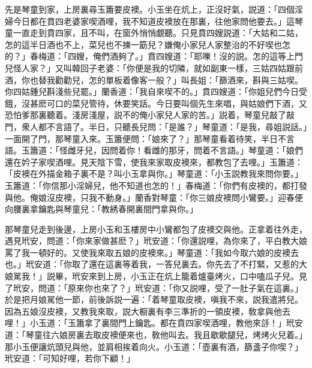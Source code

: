 先是琴童到家，上房裏尋玉簫要皮襖。小玉坐在炕上，正沒好氣，説道：「四個淫婦今日都在賁四老婆家喫酒哩，我不知道皮襖放在那裏，往他家問他要去。」這琴童一直走到賁四家，且不叫，在窗外悄悄覷聽。只見賁四嫂説道：「大姑和二姑，怎的這半日酒也不上，菜兒也不揀一筯兒？嫌俺小家兒人家整治的不好喫也怎的？」春梅道：「四嫂，俺們酒夠了。」賁四嫂道：「耶嚛！沒的説。怎的這等上門兒怪人家？」又叫韓回子老婆：「你便是我的切隣，就如副東一樣，三姑四姑跟前酒，你也替我勸勸兒，怎的單板着像客一般？」叫長姐：「篩酒來，斟與三姑喫。你四姑鍾兒斟淺些兒罷。」蘭香道：「我自來喫不的。」賁四嫂道：「你姐兒們今日受餓，沒甚麽可口的菜兒管待，休要笑話。今日要叫個先生來唱，與姑娘們下酒，又恐怕爹那裏聽着。淺房淺屋，説不的俺小家兒人家的苦。」説着，琴童兒敲了敲門，衆人都不言語了。半日，只聽長兒問：「是誰？」琴童道：「是我，尋姐説話。」一面開了門，那琴童入來。玉簫便問：「娘來了？」那琴童看着待笑，半日不言語。玉簫道：「怪雌牙兒，因問着你！看雌的那牙，問着不言語。」琴童道：「娘們還在妗子家喫酒哩。見天陰下雪，使我來家取皮襖來，都教包了去哩。」玉簫道：「皮襖在外描金箱子裏不是？叫小玉拿與你。」琴童道：「小玉説教我來問你要。」玉簫道：「你信那小淫婦兒，他不知道也怎的！」春梅道：「你們有皮襖的，都打發與他。俺娘沒皮襖，只我不動身。」蘭香對琴童：「你三娘皮襖問小鸞要。」迎春便向腰裏拿鑰匙與琴童兒：「教綉春開裏間門拿與你。」

那琴童兒走到後邊，上房小玉和玉樓房中小鸞都包了皮襖交與他。正拿着往外走，遇見玳安，問道：「你來家做甚麽？」玳安道：「你還説哩，為你來了，平白教大娘罵了我一頓好的。又使我來取五娘的皮襖來。」琴童道：「我如今取六娘的皮襖去也。」玳安道：「你取了還在這裏等着我，一答兒裏去。你先去了不打緊，又惹的大娘駡我！」説畢，玳安來到上房，小玉正在炕上籠着爐臺烤火，口中嗑瓜子兒。見了玳安，問道：「原來你也來了？」玳安道：「你又説哩，受了一肚子氣在這裏。」於是把月娘駡他一節，前後訴説一遍：「着琴童取皮襖，嗔我不來，説我遣將兒。因為五娘沒皮襖，又教我來取，説大橱裏有李三準折的一領皮襖，敎拿與他去哩！」小玉道：「玉簫拿了裏間門上鑰匙。都在賁四家喫酒哩，教他來㧱！」玳安道：「琴童往六娘房裏去取皮襖便來也，敎他叫去。我且歇歇腿兒，烤烤火兒着。」那小玉便讓炕頭兒與他，並肩相挨着向火。小玉道：「壺裏有酒，篩盞子你喫？」玳安道：「可知好哩，若你下顧！」

